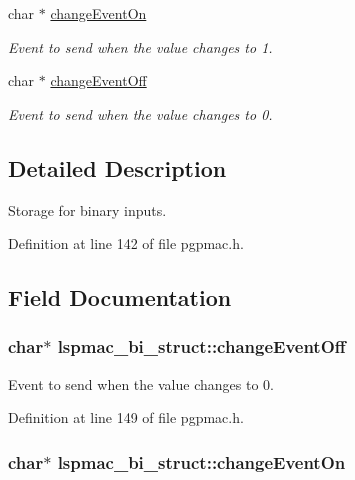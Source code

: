 \begin{DoxyCompactItemize}
char $\ast$ \hyperlink{structlspmac__bi__struct_ae7178007dfdf21be0e5b1fbaa36732af}{change\-Event\-On}
\begin{DoxyCompactList}\small\item\em Event to send when the value changes to 1. \end{DoxyCompactList}\item 
char $\ast$ \hyperlink{structlspmac__bi__struct_ae0859842f637694ace0e6d54c0e2af6a}{change\-Event\-Off}
\begin{DoxyCompactList}\small\item\em Event to send when the value changes to 0. \end{DoxyCompactList}\end{DoxyCompactItemize}


\subsection{Detailed Description}
Storage for binary inputs. 

Definition at line 142 of file pgpmac.\-h.



\subsection{Field Documentation}
\hypertarget{structlspmac__bi__struct_ae0859842f637694ace0e6d54c0e2af6a}{
\subsubsection[{change\-Event\-Off}]{\setlength{\rightskip}{0pt plus 5cm}char$\ast$ lspmac\-\_\-bi\-\_\-struct\-::change\-Event\-Off}}\label{structlspmac__bi__struct_ae0859842f637694ace0e6d54c0e2af6a}


Event to send when the value changes to 0. 



Definition at line 149 of file pgpmac.\-h.

\hypertarget{structlspmac__bi__struct_ae7178007dfdf21be0e5b1fbaa36732af}{
\subsubsection[{change\-Event\-On}]{\setlength{\rightskip}{0pt plus 5cm}char$\ast$ lspmac\-\_\-bi\-\_\-struct\-::change\-Event\-On}}\label{structlspmac__bi__struct_ae7178007dfdf21be0e5b1fbaa36732af}


